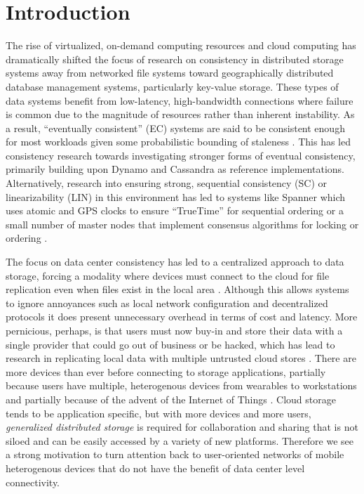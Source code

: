 \documentclass{article}
\begin{document}
\newpage
\setcounter{tocdepth}{3}
\tableofcontents

\newpage
\listoffigures

\newpage
\onehalfspacing

\section{Introduction}

The rise of virtualized, on-demand computing resources and cloud computing has dramatically shifted the focus of research on consistency in distributed storage systems away from networked file systems toward geographically distributed database management systems, particularly key-value storage. These types of data systems benefit from low-latency, high-bandwidth connections where failure is common due to the magnitude of resources rather than inherent instability. As a result, ``eventually consistent'' (EC) \cite{vogels_eventually_2009} systems are said to be consistent enough for most workloads given some probabilistic bounding of staleness \cite{bailis_quantifying_2014,bermbach_eventual_2011,bailis_probabilistically_2012}. This has led consistency research towards investigating stronger forms of eventual consistency, primarily building upon Dynamo \cite{decandia_dynamo:_2007} and Cassandra \cite{lakshman_cassandra:_2010} as reference implementations. Alternatively, research into ensuring strong, sequential consistency (SC) or linearizability (LIN) in this environment has led to systems like Spanner \cite{corbett_spanner:_2013} which uses atomic and GPS clocks to ensure ``TrueTime'' for sequential ordering or a small number of master nodes that implement consensus algorithms \cite{lamport_paxos_2001,ongaro_search_2014} for locking or ordering \cite{kraska_mdcc:_2013}.

The focus on data center consistency has led to a centralized approach to data storage, forcing a modality where devices must connect to the cloud for file replication even when files exist in the local area \cite{drago_inside_2012}. Although this allows systems to ignore annoyances such as local network configuration and decentralized protocols it does present unnecessary overhead in terms of cost and latency. More pernicious, perhaps, is that users must now buy-in and store their data with a single provider that could go out of business or be hacked, which has lead to research in replicating local data with multiple untrusted cloud stores \cite{zhang_viewbox:_2014,feldman_sporc:_2010}. There are more devices than ever before connecting to storage applications, partially because users have multiple, heterogenous devices from wearables to workstations and partially because of the advent of the Internet of Things \cite{miorandi_internet_2012}. Cloud storage tends to be application specific, but with more devices and more users, \textit{generalized distributed storage} is required for collaboration and sharing that is not siloed and can be easily accessed by a variety of new platforms. Therefore we see a strong motivation to turn attention back to user-oriented networks of mobile heterogenous devices that do not have the benefit of data center level connectivity.
\end{document}
